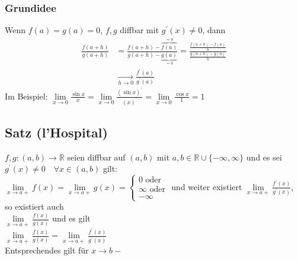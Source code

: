 \documentclass[12pt, titlepage]{article}
\newcommand{\R}{\mathds{R}}
\renewcommand{\>}{\rightarrow}
\renewcommand{\*}{\cdot}
\begin{document}
	\subsubsection*{Grundidee}
	Wenn $f(a)=g(a)=0$, $f,g$ diffbar mit $g^\prime(x)\neq0$, dann
	\begin{align*}
		\frac{f(a+h)}{g(a+h)}&=\frac{f(a+h)-\overbrace{f(a)}^{=0}}{g(a+h)-\underbrace{g(a)}_{=0}}=\frac{\frac{f(a+h)-f(a)}{h}}{\frac{g(a+h)-g(a)}{h}}\\
		&\underset{h\>0}{\>}\frac{f^\prime(a)}{g^\prime(a)}
	\end{align*}
	Im Beispiel: $\lim\limits_{x\>0}\frac{\sin x}{x}=\lim\limits_{x\>0}\frac{(\sin x)^\prime}{(x)^\prime}=\lim\limits_{x\>0}\frac{\cos x}{1}=1$
	\subsection{Satz (l'Hospital)}
	$f,g\colon(a,b)\>\R$ seien diffbar auf $(a,b)$ mit $a,b\in\R\cup\{-\infty,\infty\}$ und es sei $g^\prime(x)\neq0\quad\forall x\in(a,b)$ gilt:\\
	$\lim\limits_{x\>a+}f(x)=\lim\limits_{x\>a+}g(x)=\begin{cases}
	0\textrm{ oder}\\
	\infty\textrm{ oder}\\
	-\infty
	\end{cases}$ und weiter existiert $\lim\limits_{x\>a+}\frac{f^\prime(x)}{g^\prime(x)}$, so existiert auch\\
	$\lim\limits_{x\>a+}\frac{f(x)}{g(x)}$ und es gilt\\
	$\lim\limits_{x\>a+}\frac{f(x)}{g(x)}=\lim\limits_{x\>a+}\frac{f^\prime(x)}{g^\prime(x)}$\\
	Entsprechendes gilt für $x\>b-$	
\end{document}
